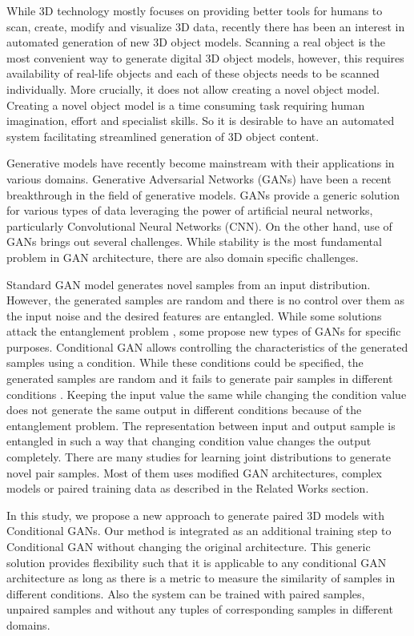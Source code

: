 \documentclass[runningheads]{llncs}
\begin{document}
While 3D technology mostly focuses on providing better tools for humans to scan, create, modify and visualize 3D data, recently there has been 
an interest in automated generation of new 3D object models. Scanning a real object is the most convenient way to generate digital 3D object
 models, however, this requires availability of real-life objects and each of these objects needs to be scanned individually. More crucially, 
 it does not allow creating a novel object model. Creating a novel object model is a time consuming task requiring human imagination, effort and 
 specialist skills. So it is desirable to have an automated system facilitating streamlined generation of 3D object content. 

Generative models have recently become mainstream with their applications in various domains. Generative Adversarial Networks (GANs) 
\cite{goodfellow2014generative} have been a recent breakthrough in the field of generative models. GANs provide a generic solution for various 
types of data leveraging the power of artificial neural networks, particularly Convolutional Neural Networks (CNN). On the other hand, use of 
GANs brings out several challenges. While stability is the most fundamental problem in GAN architecture, there are also domain specific challenges. 

Standard GAN model generates novel samples from an input distribution. However, the generated samples are random and there is no control over them as the input noise and the desired features are entangled. While some solutions attack the entanglement problem \cite{chen2016infogan}, some propose new types of GANs for specific purposes. Conditional GAN \cite{mirza2014conditional} allows controlling the characteristics of the generated samples using a condition. While these conditions could be specified, the generated samples are random and it fails to generate pair samples in different conditions \cite{liu2016coupled,mao2017aligngan}. Keeping the input value the same while changing the condition value does not generate the same output in different conditions because of the entanglement problem. The representation between input and output sample is entangled in such a way that changing condition value changes the output completely. There are many studies for learning joint distributions to generate novel pair samples. Most of them uses modified GAN architectures, complex models or paired training data as described in the Related Works section.

In this study, we propose a new approach to generate paired 3D models with Conditional GANs. Our method is integrated as an additional training step to Conditional GAN without changing the original architecture. This generic solution provides flexibility such that it is applicable to any conditional GAN architecture as long as there is a metric to measure the similarity of samples in different conditions. Also the system can be trained with paired samples, unpaired samples and without any tuples of corresponding samples in different domains.
	 
\end{document}
